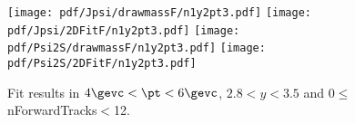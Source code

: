 \begin{figure}[H]
\begin{center}
\texttt{[image: pdf/Jpsi/drawmassF/n1y2pt3.pdf]}
\texttt{[image: pdf/Jpsi/2DFitF/n1y2pt3.pdf]}
\vspace*{-0.5cm}
\texttt{[image: pdf/Psi2S/drawmassF/n1y2pt3.pdf]}
\texttt{[image: pdf/Psi2S/2DFitF/n1y2pt3.pdf]}
\vspace*{-0.5cm}
\end{center}
\caption{Fit results in $4\gevc<\pt<6\gevc$, $2.8<y<3.5$ and 0$\leq$nForwardTracks$<$12.}
\label{Fitn1y2pt3}
\end{figure}
